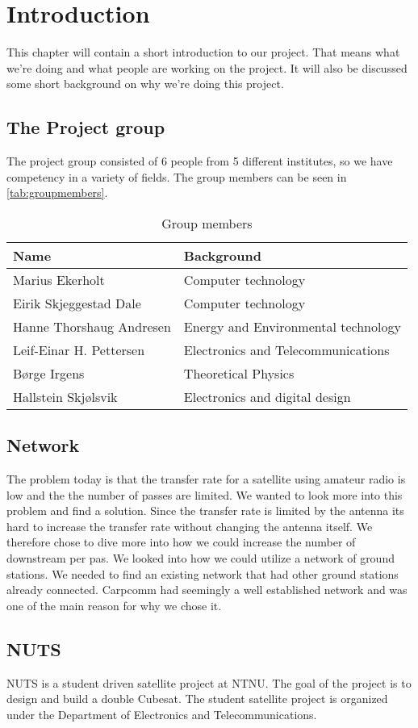\chapter{Introduction}
\label{chap:introduction}
This chapter will contain a short introduction to our project. That means what we're doing and what people are working on the project. It will also be discussed some short background on why we're doing this project.
\section{The Project group}
The project group consisted of 6 people from 5 different institutes, so we have competency in a variety of fields. The group members can be seen in \autoref{tab:groupmembers}.

\begin{table}
	\begin{center}
		\begin{tabular}{|l|l|}   
			\hline      
			\bf{Name} & \bf{Background} \\ 
			\hline
			Marius Ekerholt & Computer technology\\     
			\hline
			Eirik Skjeggestad Dale & Computer technology\\     
			\hline
			Hanne Thorshaug Andresen & Energy and Environmental technology\\     
			\hline
			Leif-Einar H. Pettersen & Electronics and Telecommunications\\     
			\hline
			Børge Irgens & Theoretical Physics\\     
			\hline
			Hallstein Skjølsvik & Electronics and digital design\\     
			\hline
		 \end{tabular}
	\end{center}
	\caption{Group members}
	\label{tab:groupmembers}
\end{table}

\section{Network}

The problem today is that the transfer rate for a satellite using amateur radio is low and the the number of passes are limited. We wanted to look more into this problem and find a solution. Since the transfer rate is limited by the antenna its hard to increase the transfer rate without changing the antenna itself. We therefore chose to dive more into how we could increase the number of downstream per pas. We looked into how we could utilize a network of ground stations. We needed to find an existing network that had other ground stations already connected. Carpcomm had seemingly a well established network and was one of the main reason for why we chose it.

\section{NUTS}

NUTS is a student driven satellite project at NTNU. The goal of the project is to design and build a double Cubesat. The student satellite project is organized under the  Department of Electronics and Telecommunications. 